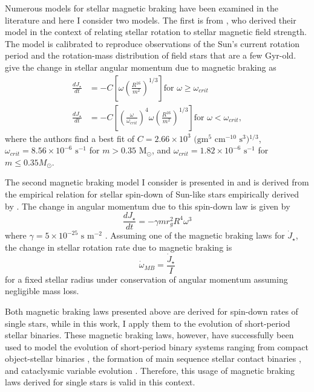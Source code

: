 Numerous models for stellar magnetic braking have been examined in the literature and here I consider two models.  The first is from \citet{Reiners2012}, who derived their model in the context of relating stellar rotation to stellar magnetic field strength.  The model is calibrated to reproduce observations of the Sun's current rotation period and the rotation-mass distribution of field stars that are a few Gyr-old.  \citet{Reiners2012} give the change in stellar angular momentum due to magnetic braking as
\begin{equation} \label{STEEP:eqn:ang_mom_loss_reiners}
\begin{split}
\frac{dJ_{\star}}{dt} & = -C \left[ \omega \left(\frac{R^{16}}{m^2} \right)^{1/3} \right] \text{for $\omega \geq \omega_{crit}$} \\
\frac{dJ_{\star}}{dt} & = -C \left[ \left( \frac{\omega}{\omega_{crit}} \right)^4 \omega \left(\frac{R^{16}}{m^2} \right)^{1/3} \right] \text{for $\omega < \omega_{crit}$},
\end{split}
\end{equation}
where the authors find a best fit of $C = 2.66 \times 10^3 \text{ (gm$^5$ cm$^{-10}$ s$^3$)$^{1/3}$}$, $\omega_{crit} = 8.56 \times 10^{-6}\text{ s$^{-1}$}$ for $m > 0.35$ M$_{\odot}$, and $\omega_{crit} = 1.82 \times 10^{-6} \text{ s$^{-1}$}$ for $m \leq 0.35 M_{\odot}$.

The second magnetic braking model I consider is presented in \citet{Repetto2014} and is derived from the empirical relation for stellar spin-down of Sun-like stars empirically derived by \citet{Skumanich1972}.  The change in angular momentum due to this spin-down law is given by
\begin{equation} \label{STEEP:eqn:ang_mom_loss_skumanich}
\frac{dJ_{\star}}{dt} = - \gamma m r_g^2 R^4 \omega^3
\end{equation}
where $\gamma = 5 \times 10^{-25} \text{ s m}^{-2}$ \citep{Repetto2014}.  Assuming one of the magnetic braking laws for $\dot{J}_{\star}$, the change in stellar rotation rate due to magnetic braking is
\begin{equation} \label{STEEP:eqn:rot_rate_dt}
\dot{\omega}_{MB} = \frac{\dot{J}_{\star}}{I}
\end{equation}
for a fixed stellar radius under conservation of angular momentum assuming negligible mass loss.  

Both magnetic braking laws presented above are derived for spin-down rates of single stars, while in this work, I apply them to the evolution of short-period stellar binaries.  These magnetic braking laws, however, have successfully been used to model the evolution of short-period binary systems ranging from compact object-stellar binaries \citep[e.g.][]{Verbunt1981,Repetto2014}, the formation of main sequence stellar contact binaries \citep[e.g.][]{Stepien1995,Andronov2006}, and cataclysmic variable evolution \citep[e.g.][]{Ivanova2003}.  Therefore, this usage of magnetic braking laws derived for single stars is valid in this context.

